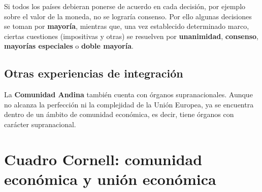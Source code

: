 \documentclass[12pt,oneside]{book}
\begin{document}
Si todos los países debieran ponerse de acuerdo en cada decisión, por ejemplo sobre el valor de la moneda, no se lograría consenso. Por ello algunas decisiones se toman por \textbf{mayoría}, mientras que, una vez establecido determinado marco, ciertas cuestiones (impositivas y otras) se resuelven por \textbf{unanimidad}, \textbf{consenso}, \textbf{mayorías especiales} o \textbf{doble mayoría}.

\subsection{Otras experiencias de integración}

La \textbf{Comunidad Andina} también cuenta con órganos supranacionales. Aunque no alcanza la perfección ni la complejidad de la Unión Europea, ya se encuentra dentro de un ámbito de comunidad económica, es decir, tiene órganos con carácter supranacional.

\section{Cuadro Cornell: comunidad económica y unión económica}
\end{document}
